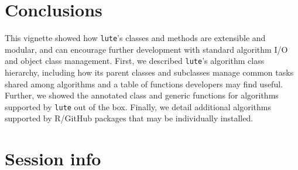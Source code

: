 \documentclass[]{article}
\begin{document}
\hypertarget{conclusions}{%
\section{Conclusions}\label{conclusions}}

This vignette showed how \texttt{lute}'s classes and methods are extensible and
modular, and can encourage further development with standard algorithm I/O and
object class management. First, we described \texttt{lute}'s algorithm class hierarchy,
including how its parent classes and subclasses manage common tasks shared among
algorithms and a table of functions developers may find useful. Further, we
showed the annotated class and generic functions for algorithms supported by
\texttt{lute} out of the box. Finally, we detail additional algorithms supported by
R/GitHub packages that may be individually installed.

\hypertarget{session-info}{%
\section{Session info}\label{session-info}}
\end{document}
